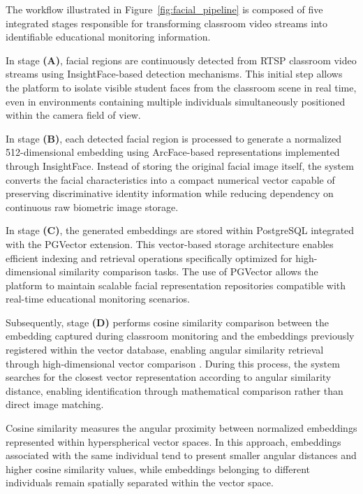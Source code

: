 \documentclass[12pt,a4paper]{article}
\begin{document}
The workflow illustrated in Figure~\ref{fig:facial_pipeline} is composed of five integrated stages responsible for transforming classroom video streams into identifiable educational monitoring information.

In stage \textbf{(A)}, facial regions are continuously detected from RTSP classroom video streams using InsightFace-based detection mechanisms. This initial step allows the platform to isolate visible student faces from the classroom scene in real time, even in environments containing multiple individuals simultaneously positioned within the camera field of view.

In stage \textbf{(B)}, each detected facial region is processed to generate a normalized 512-dimensional embedding using ArcFace-based representations \cite{dengArcFaceAdditiveAngular} implemented through InsightFace. Instead of storing the original facial image itself, the system converts the facial characteristics into a compact numerical vector capable of preserving discriminative identity information while reducing dependency on continuous raw biometric image storage.

In stage \textbf{(C)}, the generated embeddings are stored within PostgreSQL integrated with the PGVector extension. This vector-based storage architecture enables efficient indexing and retrieval operations specifically optimized for high-dimensional similarity comparison tasks. The use of PGVector allows the platform to maintain scalable facial representation repositories compatible with real-time educational monitoring scenarios.

Subsequently, stage \textbf{(D)} performs cosine similarity comparison between the embedding captured during classroom monitoring and the embeddings previously registered within the vector database, enabling angular similarity retrieval through high-dimensional vector comparison \cite{nguyenCosineSimilarityMetric2011}. During this process, the system searches for the closest vector representation according to angular similarity distance, enabling identification through mathematical comparison rather than direct image matching.

Cosine similarity measures the angular proximity between normalized embeddings represented within hyperspherical vector spaces. In this approach, embeddings associated with the same individual tend to present smaller angular distances and higher cosine similarity values, while embeddings belonging to different individuals remain spatially separated within the vector space.
\end{document}
